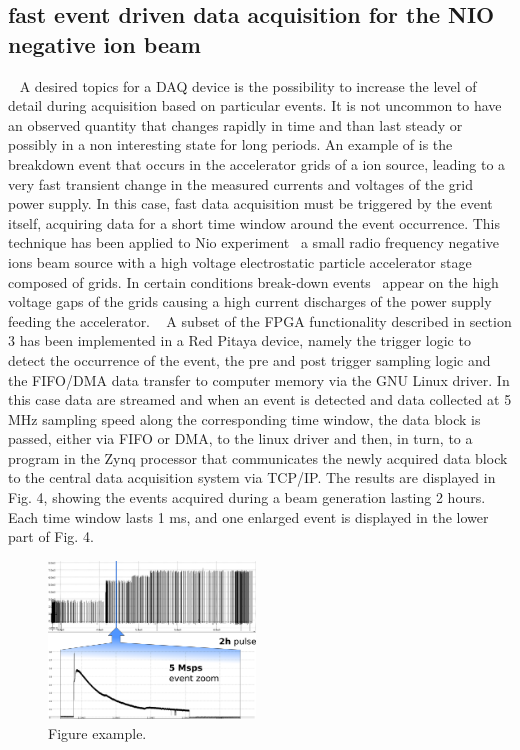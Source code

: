 \subsection{fast event driven data acquisition for the NIO negative ion beam}
\label{section:NIO1}
~
A desired topics for a DAQ device is the possibility to increase the level of detail during acquisition based on particular events. It is not uncommon to have an observed quantity that changes rapidly in time and than last steady or possibly in a non interesting state for long periods. An example of is the breakdown event that occurs in the accelerator grids of a ion source, leading to a very fast transient change in the measured currents and voltages of the grid power supply. In this case, fast data acquisition must be triggered by the event itself, acquiring data for a short time window around the event occurrence. This technique has been applied to Nio experiment~\cite{DEMURI2015249} a small radio frequency negative ions beam source with a high voltage electrostatic particle accelerator stage composed of grids. In certain conditions break-down events~\cite{RECCHIA20111545} appear on the high voltage gaps of the grids causing a  high current discharges of the power supply feeding the accelerator. 
~
A subset of the FPGA functionality described in section 3 has been implemented in a Red Pitaya device, namely the trigger logic to detect the occurrence of the event, the pre and post trigger sampling logic and the FIFO/DMA data transfer to computer memory via the GNU Linux driver. In this case data are streamed and when an event is detected and data collected at 5 MHz sampling speed along the corresponding time window, the data block is passed, either via FIFO or DMA, to the linux driver and then, in turn, to a program in the Zynq processor that communicates the newly acquired data block to the central data acquisition system via TCP/IP. The results are displayed in Fig. 4, showing the events acquired during a beam generation lasting 2 hours. Each time window lasts 1 ms, and one enlarged event is  displayed in the lower part of Fig. 4.    
\begin{figure}
\centering
\includegraphics[width=0.49\textwidth]{img/4_EmbeddedML/nio12b.png}
\caption{Figure example.}
\label{fig:nio}
\end{figure}



